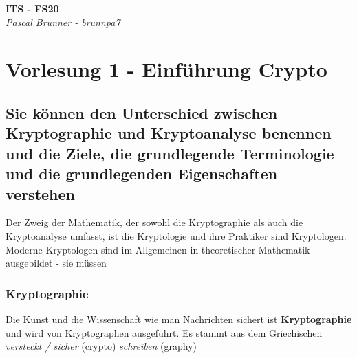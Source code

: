 \documentclass{report}
\theoremstyle{definition}
\theoremstyle{example}
\begin{document}
\begin{titlepage}
   \begin{center}
      \Large\textbf{ITS - FS20}\\
      \large\textit{Pascal Brunner - brunnpa7}
   \end{center}
\end{titlepage}


\tableofcontents

\newpage

\chapter{Vorlesung 1 - Einführung Crypto}

\section{Sie können den Unterschied zwischen Kryptographie und Kryptoanalyse benennen und die Ziele, die grundlegende Terminologie und die grundlegenden Eigenschaften verstehen}
Der Zweig der Mathematik, der sowohl die Kryptographie als auch die Kryptoanalyse umfasst, ist die Kryptologie und ihre Praktiker sind Kryptologen. \\
Moderne Kryptologen sind im Allgemeinen in theoretischer Mathematik ausgebildet - sie müssen
	\subsection{Kryptographie}
Die Kunst und die Wissenschaft wie man Nachrichten sichert ist \textbf{Kryptographie} und wird von Kryptographen ausgeführt. Es stammt aus dem Griechischen \textit{versteckt / sicher} (crypto) \textit{schreiben} (graphy)\\
\end{document}
